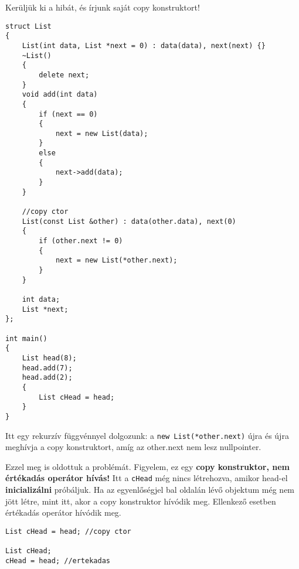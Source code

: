 \documentclass[a4paper,11.5pt]{article}
\begin{document}
	Kerüljük ki a hibát, és írjunk saját copy konstruktort!
	
	
\begin{lstlisting}
struct List
{
	List(int data, List *next = 0) : data(data), next(next) {}
	~List()
	{
		delete next;
	}
	void add(int data)
	{
		if (next == 0)
		{
			next = new List(data);
		}
		else
		{
			next->add(data);
		}
	}
	
	//copy ctor
	List(const List &other) : data(other.data), next(0)
	{
		if (other.next != 0)
		{
			next = new List(*other.next);
		}
	}
	
	int data;
	List *next;
};

int main()
{
	List head(8);
	head.add(7);
	head.add(2);
	{
		List cHead = head;
	}
}
\end{lstlisting}
	Itt egy rekurzív függvénnyel dolgozunk: a \texttt{new List(*other.next)} újra és újra meghívja a copy konstruktort, amíg az other.next nem lesz nullpointer.
	
	\medskip
	Ezzel meg is oldottuk a problémát. Figyelem, ez egy {\large \textbf{copy konstruktor, nem értékadás operátor hívás!}} Itt a \texttt{cHead} még nincs létrehozva, amikor head-el \textbf{inicializálni} próbáljuk. Ha az egyenlőségjel bal oldalán lévő objektum még nem jött létre, mint itt, akor a copy konstruktor hívódik meg. Ellenkező esetben értékadás operátor hívódik meg.
	\begin{lstlisting}
List cHead = head; //copy ctor

List cHead;
cHead = head; //ertekadas
	\end{lstlisting}
\end{document}
